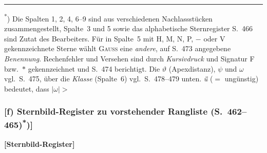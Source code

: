 \documentclass[12pt,a4paper]{article}
\theoremstyle{plain}
\theoremstyle{definition}
\theoremstyle{remark}
\begin{document}
\medskip
\noindent\rule{\textwidth}{0.4pt}
\begin{footnotesize}
\textsuperscript{*}) Die Spalten 1, 2, 4, 6--9 sind aus verschiedenen Nachlassst\"ucken
zusammengestellt, Spalte~3 und 5 sowie das alphabetische Sternregister S.~466
sind Zutat des Bearbeiters. F\"ur in Spalte~5 mit H, M, N, P, $-$ oder V
gekennzeichnete Sterne w\"ahlt \textsc{Gau\ss} eine \textit{andere}, auf S.~473 angegebene
\textit{Benennung}. Rechenfehler und Versehen sind durch \textit{Kursivdruck} und Signatur
F bzw.~$*$ gekennzeichnet und S.~474 berichtigt. Die $\vartheta$ (Apexdistanz), $\psi$ und
$\omega$ vgl.~S.~475, \"uber die \textit{\glqq Klasse\grqq} (Spalte~6) vgl.~S.~478--479 unten.
\textit{\"u\"} ($=$ ung\"unstig) bedeutet, dass $|\omega| >$
\end{footnotesize}

\newpage
\subsubsection*{[f) Sternbild-Register zu vorstehender Rangliste (S.~462--465)\textsuperscript{*})]}

\begin{center}
\textbf{[Sternbild-Register]}
\end{center}
\end{document}
